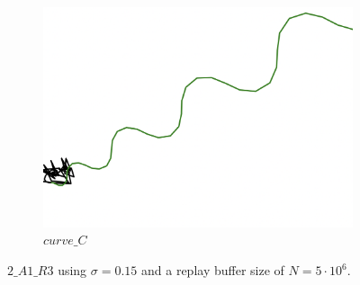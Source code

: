 \begin{figure}[H]
\begin{subfigure}[b]{0.31\textwidth}
         \includegraphics[width=\textwidth]{images/ddpg_results/simple_envs_S1_S2/S2_A1_R3_5mio_curve_C.png}
         \caption{$curve\_C$}
     \end{subfigure}
        \caption{$2\_A1\_R3$ using $\sigma=0.15$ and a replay buffer size of $N=5\cdot 10^6$.}
        \label{fig:simpleCurves4}
\end{figure}

